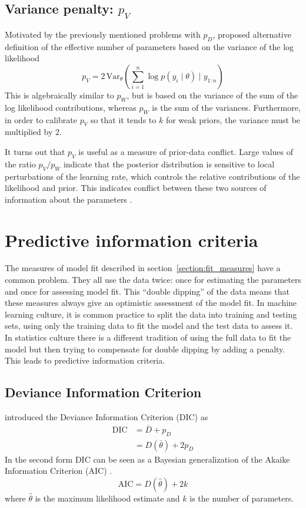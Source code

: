\documentclass[11pt, a4paper, titlepage]{report}
\begin{document}
{\subsection{Variance penalty: $p_V$}

Motivated by the previously mentioned problems with $p_D$,
\cite{Gelman2004BDA} proposed alternative definition of the effective
number of parameters based on the variance of the log likelihood
\[
p_V = 2\, \text{Var}_{\theta} \left( \sum_{i=1}^n \log p(y_i \mid \theta) \mid y_{1:n} \right) 
\]
This is algebraically similar to $p_W$, but is based on the variance
of the sum of the log likelihood contributions, whereas $p_W$ is the
sum of the variances. Furthermore, in order to calibrate $p_V$ so that
it tends to $k$ for weak priors, the variance must be multiplied by 2.

It turns out that $p_V$ is useful as a measure of prior-data
conflict. Large values of the ratio $p_V/p_W$ indicate that the
posterior distribution is sensitive to local perturbations of the
learning rate, which controls the relative contributions of the
likelihood and prior.  This indicates conflict between these two
sources of information about the parameters \citep{Plummer2025}.

\section{Predictive information criteria}

The measures of model fit described in
section~\ref{section:fit_measures} have a common problem. They all use
the data twice: once for estimating the parameters and once for
assessing model fit. This ``double dipping'' of the data means that
these measures always give an optimistic assessment of the model
fit. In machine learning culture, it is common practice to split the
data into training and testing sets, using only the training data to
fit the model and the test data to assess it.  In statistics culture
there is a different tradition of using the full data to fit the model
but then trying to compensate for double dipping by adding a penalty.
This leads to predictive information criteria.

\subsection{Deviance Information Criterion}
\label{section:dic}

\citet{spiegelhalter:etal:2002} introduced the Deviance Information Criterion (DIC) as
\begin{align*}
  \text{DIC} & = \overline{D} + p_D \\
             & = D(\overline{\theta}) + 2 p_D
\end{align*}
In the second form DIC can be seen as a Bayesian generalization of the
Akaike Information Criterion (AIC) \citep{Akaike1973}.
\[
\text{AIC} = D(\widehat{\theta}) + 2 k
\]
where $\widehat{\theta}$ is the maximum likelihood estimate and $k$ is the number
of parameters.

}
\end{document}
